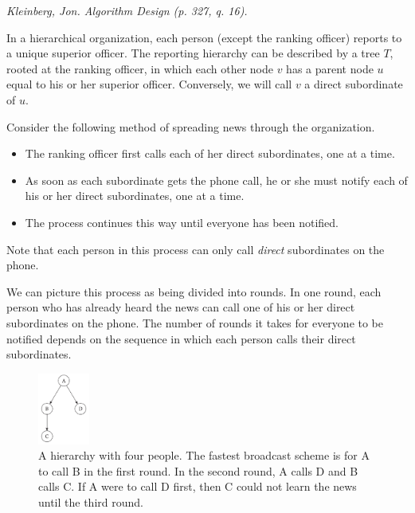 \documentclass[solutionorbox,answers]{exam}
\begin{document}
\begin{questions}
\question \textit{Kleinberg, Jon. Algorithm Design (p. 327, q. 16).} 

In a hierarchical organization, each person (except the ranking officer) reports to a unique superior officer. The reporting hierarchy can be described by a tree $T$, rooted at the ranking officer, in which each other node $v$ has a parent node $u$ equal to his or her superior officer. Conversely, we will call $v$ a direct subordinate of $u$. 

Consider the following method of spreading news through the organization. 
\begin{itemize}
\item The ranking officer first calls each of her direct subordinates, one at a time. 
\item As soon as each subordinate gets the phone call, he or she must notify each of his or her direct subordinates, one at a time. 
\item The process continues this way until everyone has been notified. 
\end{itemize}

Note that each person in this process can only call \textit{direct} subordinates on the phone. 

We can picture this process as being divided into rounds. In one round, each person who has already heard the news can call one of his or her direct subordinates on the phone. The number of rounds it takes for everyone to be notified depends on the sequence in which each person calls their direct subordinates.

\begin{figure}
    \includegraphics[width=0.15\textwidth]{q3.png}
    \caption{A hierarchy with four people. The fastest broadcast scheme is for A to call B in the first round. In the second round, A calls D and B calls C. If A were to call D first, then C could not learn the news until the third round.}
    \label{fig:q3}
\end{figure}

\newpage


\end{questions}
\end{document}
